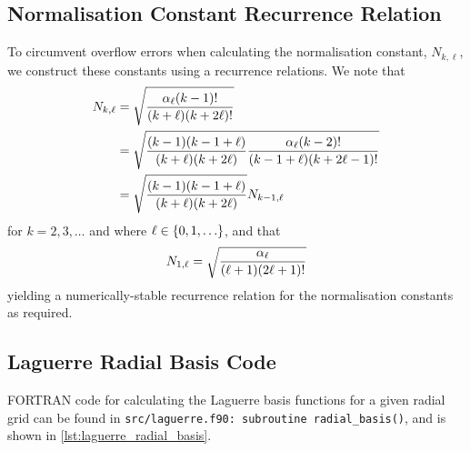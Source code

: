 \documentclass[]{article}
\begin{document}
\subsection{Normalisation Constant Recurrence Relation}
\label{sec:norm-const}

To circumvent overflow errors when calculating the normalisation constant,
$N_{k, \ell}$, we construct these constants using a recurrence relations.
We note that
\begin{alignat*}{2}
  N_{k, \ell}
  {}={}
  &
  \sqrt
  {
    \dfrac
    {
      \alpha_{\ell}
      (k - 1)!
    }
    {
      (k + \ell)
      (k + 2\ell)!
    }
  }
  \\
  {}={}
  &
  \sqrt
  {
    \dfrac
    {
      (k - 1)
      (k - 1 + \ell)
    }
    {
      (k + \ell)
      (k + 2\ell)
    }
    \dfrac
    {
      \alpha_{\ell}
      (k - 2)!
    }
    {
      (k - 1 + \ell)
      (k + 2\ell - 1)!
    }
  }
  \\
  {}={}
  &
  \sqrt
  {
    \dfrac
    {
      (k - 1)
      (k - 1 + \ell)
    }
    {
      (k + \ell)
      (k + 2\ell)
    }
  }
  N_{k - 1, \ell}
\end{alignat*}
for $k = 2, 3, \dotsc$ and where $\ell \in \lrset{0, 1, \dotsc}$, and that
\begin{equation*}
  N_{1, \ell}
  =
  \sqrt
  {
    \dfrac
    {
      \alpha_{\ell}
    }
    {
      (\ell + 1)
      (2\ell + 1)!
    }
  }
\end{equation*}
yielding a numerically-stable recurrence relation for the normalisation
constants as required.

\subsection{Laguerre Radial Basis Code}
\label{sec:lagu-radi-basis-code}

FORTRAN code for calculating the Laguerre basis functions for a given radial
grid can be found in
\lstinline[style=ff]{src/laguerre.f90: }\lstinline{subroutine radial_basis()},
and is shown in \autoref{lst:laguerre_radial_basis}.



\end{document}

